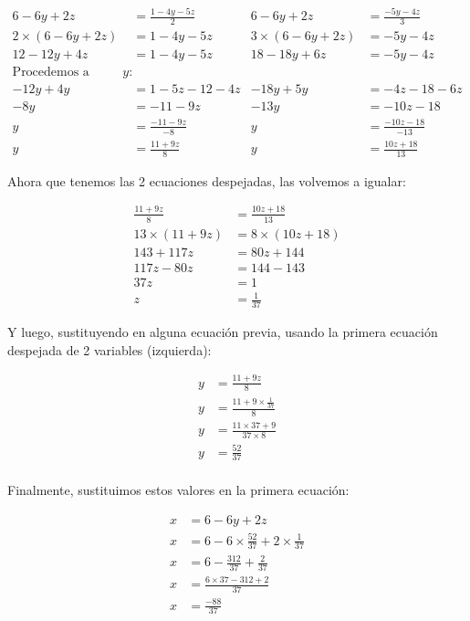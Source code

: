 \documentclass[12pt]{article}
\begin{document}
    \begin{align*}
        6-6y+2z &= \frac{1-4y-5z}{2}    & 6-6y+2z &= \frac{-5y-4z}{3}  		\\
        2\times(6-6y+2z )&= 1-4y-5z     & 3\times(6-6y+2z) &= -5y-4z        \\
        12-12y+4z &= 1-4y-5z            & 18-18y+6z &= -5y -4z \\
        \text{Procedemos a despejar la }y:\\
        -12y+4y &= 1-5z-12-4z           & -18y+5y &= -4z-18-6z \\
        -8y &= -11 -9z                  & -13y    &= -10z -18 \\
        y &= \frac{-11-9z}{-8}          & y &= \frac{-10z-18}{-13} \\
        y&= \frac{11+9z}{8}             & y&= \frac{10z+18}{13}
    \end{align*}

    Ahora que tenemos las 2 ecuaciones despejadas, las volvemos a igualar:

    \begin{align*}
        \frac{11+9z}{8}  &= \frac{10z+18}{13}  		\\
        13\times(11+9z)  &= 8\times(10z+18)     \\
        143+117z &= 80z +144\\
        117z-80z &= 144-143\\
        37z     &= 1 \\
        z &= \frac{1}{37}
    \end{align*}

    Y luego, sustituyendo en alguna ecuación previa, usando la primera ecuación
    despejada de 2 variables  (izquierda):

    \begin{align*}
        y &= \frac{11+9z}{8} \\
        y &= \frac{11+9\times \frac{1}{37} }{8}\\
        y&= \frac{11\times37+9}{37\times8}  \\
        y&= \frac{52}{37} \\
    \end{align*}

    Finalmente, sustituimos estos valores en la primera ecuación:

    \begin{align*}
        x&= 6-6y+2z	\\
        x &= 6- 6\times \frac{52}{37} + 2\times \frac{1}{37}\\
        x&= 6- \frac{312}{37} + \frac{2}{37} \\
        x &= \frac{6\times37 - 312 + 2}{37}\\
        x &=\frac{-88}{37}
    \end{align*}
\end{document}
